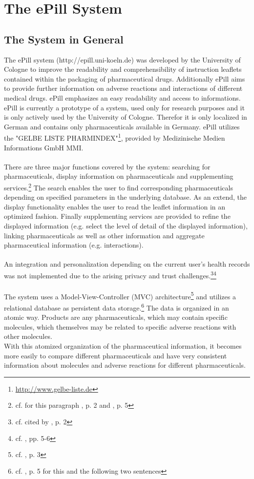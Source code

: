 \section{The ePill System}
\subsection{The System in General}
The ePill system (http://epill.uni-koeln.de) was developed by the University of Cologne to improve the readability and comprehensibility of instruction leaflets contained within the packaging of pharmaceutical drugs. Additionally ePill aims to provide further information on adverse reactions and interactions of different medical drugs. ePill emphasizes an easy readability and access to informations.
\\
ePill is currently a prototype of a system, used only for research purposes and it is only actively used by the University of Cologne. Therefor it is only localized in German and contains only pharmaceuticals available in Germany. ePill utilizes the "GELBE LISTE PHARMINDEX"\footnote{\url{http://www.gelbe-liste.de}}, provided by Medizinische Medien Informations GmbH MMI.
\\
\\
There are three major functions covered by the system: searching for pharmaceuticals, display information on pharmaceuticals and supplementing services.\footnote{cf. for this paragraph \cite{Dehling.2012}, p. 2 and \cite{Dehling.2012b}, p. 5} The search enables the user to find corresponding pharmaceuticals depending on specified parameters in the underlying database. As an extend, the display functionality enables the user to read the leaflet information in an optimized fashion. Finally supplementing services are provided to refine the displayed information (e.g. select the level of detail of the displayed information), linking pharmaceuticals as well as other information and aggregate pharmaceutical information (e.g. interactions). 
\\
\\
An integration and personalization depending on the current user's health records was not implemented due to the arising privacy and trust challenges.\footnote{cf. \cite{Kaletsch.2011} cited by \cite{Dehling.2012}, p. 2}\footnote{cf. \cite{Kaletsch.2011}, pp. 5-6}
\\
\\
The system uses a Model-View-Controller (MVC) architecture\footnote{cf. \cite{Dehling.2012}, p. 3} and utilizes a relational database as persistent data storage.\footnote{cf. \cite{Dehling.2012}, p. 5 for this and the following two sentences} The data is organized in an atomic way. Products are any pharmaceuticals, which may contain specific molecules, which themselves may be related to specific adverse reactions with other molecules. 
\\
With this atomized organization of the pharmaceutical information, it becomes more easily to compare different pharmaceuticals and have very consistent information about molecules and adverse reactions for different pharmaceuticals.

